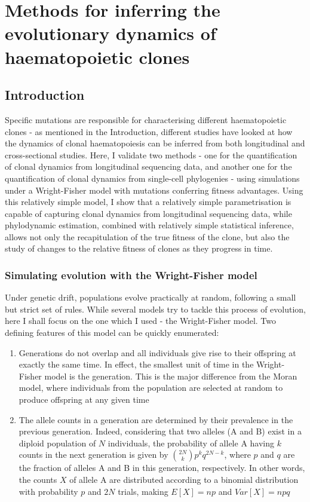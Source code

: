 \chapter{Methods for inferring the evolutionary dynamics of haematopoietic clones}

\section{Introduction}

Specific mutations are responsible for characterising different haematopoietic clones - as mentioned in the Introduction, different studies have looked at how the dynamics of clonal haematopoiesis can be inferred from both longitudinal and cross-sectional studies. Here, I validate two methods - one for the quantification of clonal dynamics from longitudinal sequencing data, and another one for the quantification of clonal dynamics from single-cell phylogenies - using simulations under a Wright-Fisher model with mutations conferring fitness advantages. Using this relatively simple model, I show that a relatively simple parametrisation is capable of capturing clonal dynamics from longitudinal sequencing data, while phylodynamic estimation, combined with relatively simple statistical inference, allows not only the recapitulation of the true fitness of the clone, but also the study of changes to the relative fitness of clones as they progress in time.

\subsection{Simulating evolution with the Wright-Fisher model}

Under genetic drift, populations evolve practically at random, following a small but strict set of rules. While several models try to tackle this process of evolution, here I shall focus on the one which I used - the Wright-Fisher model. Two defining features of this model can be quickly enumerated:

\begin{enumerate}
	\item Generations do not overlap and all individuals give rise to their offspring at exactly the same time. In effect, the smallest unit of time in the Wright-Fisher model is the generation. This is the major difference from the Moran model, where individuals from the population are selected at random to produce offspring at any given time
	\item The allele counts in a generation are determined by their prevalence in the previous generation. Indeed, considering that two alleles (A and B) exist in a diploid population of $N$ individuals, the probability of allele A having $k$ counts in the next generation is given by $\binom{2N}{k}p^kq^{2N-k}$, where $p$ and $q$ are the fraction of alleles A and B in this generation, respectively. In other words, the counts $X$ of allele A are distributed according to a binomial distribution with probability $p$ and $2N$ trials, making $E[X] = np$ and $Var[X] = npq$
\end{enumerate}

